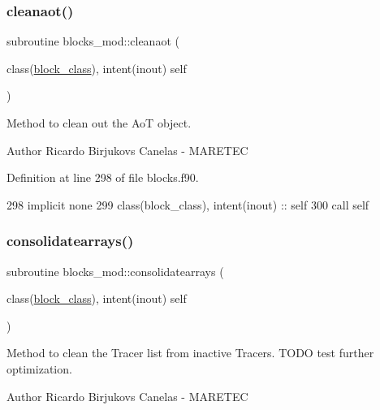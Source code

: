 \subsubsection{\texorpdfstring{cleanaot()}{cleanaot()}}
{\footnotesize\ttfamily subroutine blocks\+\_\+mod\+::cleanaot (\begin{DoxyParamCaption}\item[{class(\mbox{\hyperlink{structblocks__mod_1_1block__class}{block\+\_\+class}}), intent(inout)}]{self }\end{DoxyParamCaption})\hspace{0.3cm}{\ttfamily [private]}}



Method to clean out the AoT object. 

\begin{DoxyAuthor}{Author}
Ricardo Birjukovs Canelas -\/ M\+A\+R\+E\+T\+EC 
\end{DoxyAuthor}


Definition at line 298 of file blocks.\+f90.


\begin{DoxyCode}
298     \textcolor{keywordtype}{implicit none}
299     \textcolor{keywordtype}{class}(block\_class), \textcolor{keywordtype}{intent(inout)} :: self    
300     \textcolor{keyword}{call }self%
\end{DoxyCode}
\mbox{\label{namespaceblocks__mod_a25ff530b5125e4cee5b1f474b2491883}} 
\subsubsection{\texorpdfstring{consolidatearrays()}{consolidatearrays()}}
{\footnotesize\ttfamily subroutine blocks\+\_\+mod\+::consolidatearrays (\begin{DoxyParamCaption}\item[{class(\mbox{\hyperlink{structblocks__mod_1_1block__class}{block\+\_\+class}}), intent(inout)}]{self }\end{DoxyParamCaption})\hspace{0.3cm}{\ttfamily [private]}}



Method to clean the Tracer list from inactive Tracers. T\+O\+DO test further optimization. 

\begin{DoxyAuthor}{Author}
Ricardo Birjukovs Canelas -\/ M\+A\+R\+E\+T\+EC 
\end{DoxyAuthor}


